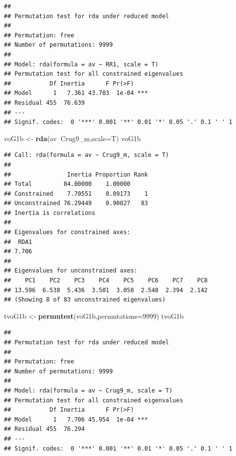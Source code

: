 \documentclass[]{article}
\newenvironment{Shaded}{\begin{snugshade}}{\end{snugshade}}
\newcommand{\DataTypeTok}[1]{\textcolor[rgb]{0.13,0.29,0.53}{#1}}
\newcommand{\DecValTok}[1]{\textcolor[rgb]{0.00,0.00,0.81}{#1}}
\newcommand{\KeywordTok}[1]{\textcolor[rgb]{0.13,0.29,0.53}{\textbf{#1}}}
\newcommand{\NormalTok}[1]{#1}
\newcommand{\OperatorTok}[1]{\textcolor[rgb]{0.81,0.36,0.00}{\textbf{#1}}}
\newcommand{\StringTok}[1]{\textcolor[rgb]{0.31,0.60,0.02}{#1}}
\begin{document}
\begin{verbatim}
## 
## Permutation test for rda under reduced model 
## 
## Permutation: free
## Number of permutations: 9999
##  
## Model: rda(formula = av ~ RR1, scale = T)
## Permutation test for all constrained eigenvalues
##           Df Inertia      F Pr(>F)    
## Model      1   7.361 43.703  1e-04 ***
## Residual 455  76.639                  
## ---
## Signif. codes:  0 '***' 0.001 '**' 0.01 '*' 0.05 '.' 0.1 ' ' 1
\end{verbatim}

\begin{Shaded}
\begin{Highlighting}[]
\NormalTok{voG1b <-}\StringTok{ }\KeywordTok{rda}\NormalTok{(av}\OperatorTok{~}\NormalTok{Crug9_m,}\DataTypeTok{scale=}\NormalTok{T)}
\NormalTok{voG1b}
\end{Highlighting}
\end{Shaded}

\begin{verbatim}
## Call: rda(formula = av ~ Crug9_m, scale = T)
## 
##                Inertia Proportion Rank
## Total         84.00000    1.00000     
## Constrained    7.70551    0.09173    1
## Unconstrained 76.29449    0.90827   83
## Inertia is correlations 
## 
## Eigenvalues for constrained axes:
##  RDA1 
## 7.706 
## 
## Eigenvalues for unconstrained axes:
##    PC1    PC2    PC3    PC4    PC5    PC6    PC7    PC8 
## 13.596  6.538  5.436  3.501  3.058  2.548  2.394  2.142 
## (Showing 8 of 83 unconstrained eigenvalues)
\end{verbatim}

\begin{Shaded}
\begin{Highlighting}[]
\NormalTok{tvoG1b <-}\StringTok{ }\KeywordTok{permutest}\NormalTok{(voG1b,}\DataTypeTok{permutations=}\DecValTok{9999}\NormalTok{)}
\NormalTok{tvoG1b}
\end{Highlighting}
\end{Shaded}

\begin{verbatim}
## 
## Permutation test for rda under reduced model 
## 
## Permutation: free
## Number of permutations: 9999
##  
## Model: rda(formula = av ~ Crug9_m, scale = T)
## Permutation test for all constrained eigenvalues
##           Df Inertia      F Pr(>F)    
## Model      1   7.706 45.954  1e-04 ***
## Residual 455  76.294                  
## ---
## Signif. codes:  0 '***' 0.001 '**' 0.01 '*' 0.05 '.' 0.1 ' ' 1
\end{verbatim}
\end{document}
